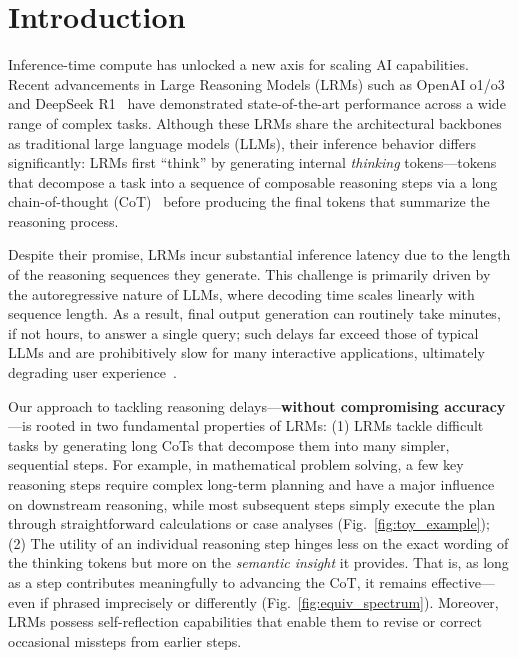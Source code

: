 \section{Introduction}





Inference-time compute has unlocked a new axis for scaling AI capabilities. Recent advancements in Large Reasoning Models (LRMs) such as OpenAI o1/o3~\citep{openai_o1,openai_o3} and DeepSeek R1~\citep{deepseek_r1} have demonstrated state-of-the-art performance across a wide range of complex tasks. 
Although these LRMs share the architectural backbones as traditional large language models (LLMs), their inference behavior differs significantly: LRMs first ``think'' by generating internal {\em thinking} tokens---tokens that decompose a task into a sequence of composable reasoning steps via a long chain-of-thought (CoT)~\citep{cot} before producing the final tokens that summarize the reasoning process.

Despite their promise, LRMs incur substantial inference latency due to the length of the reasoning sequences they generate. This challenge is primarily driven by the autoregressive nature of LLMs, where decoding time scales linearly with sequence length. As a result, final output generation can routinely take minutes, if not hours, to answer a single query; such delays far exceed those of typical LLMs and are prohibitively slow for many interactive applications, ultimately degrading user experience~\citep{certaindex}.

Our approach to tackling reasoning delays---{\bf without compromising accuracy}---is rooted in two fundamental properties of LRMs: (1) LRMs tackle difficult tasks by generating long CoTs that decompose them into many simpler, sequential steps. For example, in mathematical problem solving, a few key reasoning steps require complex long-term planning and have a major influence on downstream reasoning, while most subsequent steps simply execute the plan through straightforward calculations or case analyses (Fig.~\ref{fig:toy_example});
(2) The utility of an individual reasoning step hinges less on the exact wording of the thinking tokens but more on the {\em semantic insight} it provides.
That is,  as long as a step contributes meaningfully to advancing the CoT, it remains effective—even if phrased imprecisely or differently (Fig.~\ref{fig:equiv_spectrum}).
Moreover, LRMs possess self-reflection capabilities that enable them to revise or correct occasional missteps from earlier steps. 

